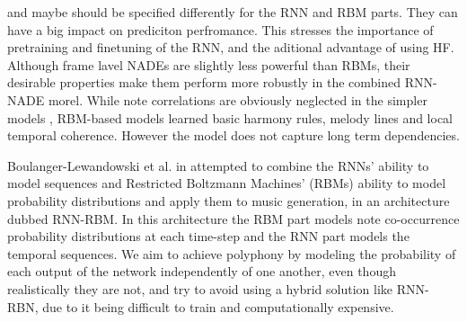 and maybe should be specified differently for the RNN and RBM parts. They can have a big impact on prediciton perfromance. This stresses the importance of pretraining and finetuning of the RNN, and the aditional advantage of using HF. Although frame lavel NADEs are slightly less powerful than RBMs, their desirable properties make them perform more robustly in the combined RNN-NADE morel. While note correlations are obviously neglected in the simpler models , RBM-based models learned basic harmony rules, melody lines and local temporal coherence. However the model does not capture long term dependencies.

\cite{Boulanger-Lewandowski2014} Boulanger-Lewandowski et al. in \cite{Boulanger-Lewandowski2014} attempted to combine the RNNs' ability to model sequences and Restricted Boltzmann Machines' (RBMs) ability to model probability distributions and apply them to music generation, in an architecture dubbed RNN-RBM. In this architecture the RBM part models note co-occurrence probability distributions at each time-step and the RNN part models the temporal sequences. We aim to achieve polyphony by modeling  the probability of each output of the network independently of one another, even though realistically they are not, and try to avoid using a hybrid solution like RNN-RBN, due to it being difficult to train and computationally expensive.


